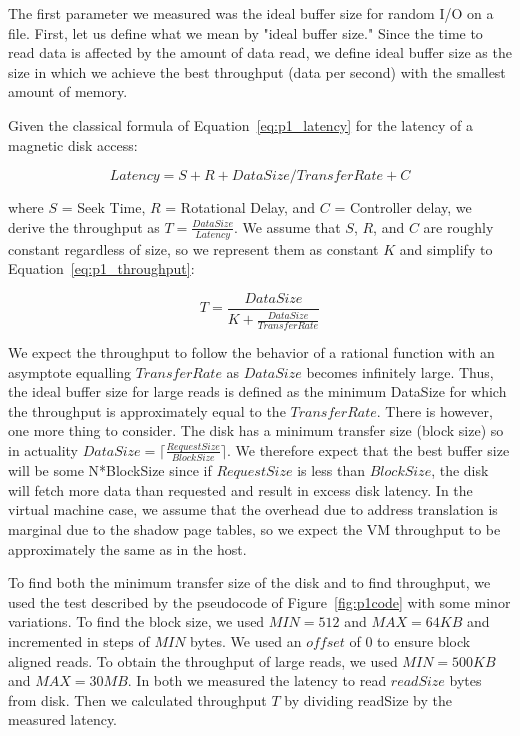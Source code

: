 The first parameter we measured was the ideal buffer size for random I/O 
on a file. First, let us define what we mean by "ideal buffer size." Since
the time to read data is affected by the amount of data read, we define ideal
buffer size as the size in which we achieve the best throughput (data per second)
with the smallest amount of memory. 

Given the classical formula of Equation~\ref{eq:p1_latency} for the latency 
of a magnetic disk access:

\begin{equation}\label{eq:p1_latency}
Latency = S + R + DataSize/TransferRate + C
\end{equation}

where $S$ = Seek Time, $R$ = Rotational Delay, and $C$ = Controller delay, we 
derive the throughput as $T = \frac{DataSize}{Latency}$. We assume that $S$, $R$, 
and $C$ are roughly constant regardless of size, so we represent them as constant 
$K$ and simplify to Equation~\ref{eq:p1_throughput}:

\begin{equation}\label{eq:p1_throughput}
T = \frac{DataSize}{K + \frac{DataSize}{TransferRate}}
\end{equation}

We expect the throughput to follow the behavior of a rational function
with an asymptote equalling $TransferRate$ as $DataSize$ becomes infinitely large.
Thus, the ideal buffer size for large reads is defined as the minimum DataSize for 
which the throughput is approximately equal to the $TransferRate$. There is however, 
one more thing to consider. The disk has a minimum transfer size
(block size) so in actuality $DataSize = \lceil\frac{RequestSize}{BlockSize}\rceil$.
We therefore expect that the best buffer size will be some N*BlockSize since
if $RequestSize$ is less than $BlockSize$, the disk will fetch more data than
requested and result in excess disk latency. In the virtual machine case, we assume 
that the overhead due to address translation is marginal due to the shadow page 
tables, so we expect the VM throughput to be approximately the same as in the host.

To find both the minimum transfer size of the disk and to find throughput, we used 
the test described by the pseudocode of Figure~\ref{fig:p1code} with some minor 
variations. To find the block size, we used $MIN = 512$ and $MAX = 64KB $ and 
incremented in steps of $MIN$ bytes. We used an $offset$ of 0 to ensure block 
aligned reads. To obtain the throughput of large reads, we used $MIN = 500KB$ and
$MAX = 30MB$. In both we measured the latency to read $readSize$ bytes from disk.
Then we calculated throughput $T$ by dividing readSize by the measured latency. 

